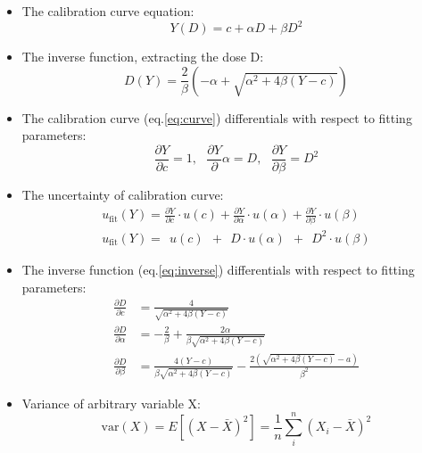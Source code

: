 \documentclass[a4paper,11pt]{article}
\begin{document}
\begin{itemize}
\item The calibration curve equation:
\begin{equation} \label{eq:curve}
Y(D) = c + \alpha D + \beta D^2
\end{equation}
\item The inverse function, extracting the dose D:
\begin{equation} \label{eq:inverse}
D(Y) = \frac{2}{\beta} \left(  -\alpha + \sqrt{\alpha^2 + 4 \beta (Y-c)} \right)
\end{equation}
\item The calibration curve (eq.\ref{eq:curve}) differentials with respect to fitting parameters:
\begin{equation} \label{eq:curvediff}
\frac{\partial Y}{\partial c} = 1,~~~\frac{\partial Y}{\partial}{\alpha} = D,~~~\frac{\partial Y}{\partial \beta} = D^2
\end{equation}
\item The uncertainty of calibration curve:
\begin{equation} \label{eq:ucurve}
\begin{split}
u_{\textrm{fit}}(Y) = \frac{\partial Y}{\partial c} \cdot u(c) + \frac{\partial Y}{\partial \alpha} \cdot u(\alpha) + \frac{\partial Y}{\partial \beta} \cdot u(\beta)\\
u_{\textrm{fit}}(Y) =~~u(c)~~+~~D\cdot u(\alpha)~~+~~D^2 \cdot u(\beta)
\end{split}
\end{equation}
\item The inverse function (eq.\ref{eq:inverse}) differentials with respect to fitting parameters:
\begin{subequations}
\begin{align}
\frac{\partial D}{\partial c} &= \frac{4}{\sqrt{\alpha^2+4\beta(Y-c)}} \label{eq:invdiffc}\\
\frac{\partial D}{\partial \alpha} &= -\frac{2}{\beta} + \frac{2\alpha}{\beta\sqrt{\alpha^2+4\beta(Y-c)}} \label{eq:invdiffa}\\
\frac{\partial D}{\partial \beta} &= \frac{4(Y-c)}{\beta\sqrt{\alpha^2+4\beta(Y-c)}} - \frac{2\left( \sqrt{\alpha^2+4\beta(Y-c)} -a \right)}{\beta^2} \label{eq:invdiffb}
\end{align}
\end{subequations}
\item Variance of arbitrary variable X:
\begin{equation} \label{eq:var}
\textrm{var}(X) = E\left[ (X-\bar X)^2 \right] = \frac{1}{n} \sum^{n}_{i} (X_i-\bar X)^2

\end{equation}
\end{itemize}
\end{document}
